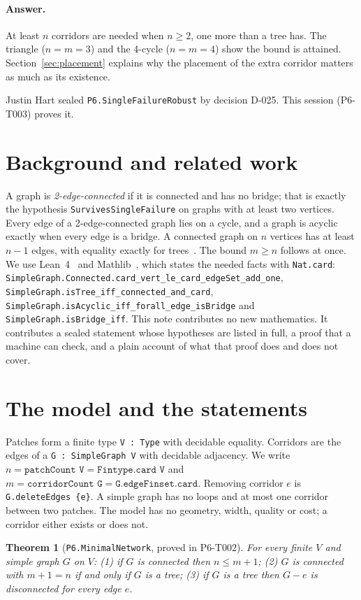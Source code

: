 \documentclass[11pt]{article}
\newtheorem{theorem}{Theorem}
\begin{document}
\paragraph{Answer.} At least $n$ corridors are needed when $n\ge 2$, one more than a tree has. The triangle
($n=m=3$) and the 4-cycle ($n=m=4$) show the bound is attained. Section~\ref{sec:placement} explains why the
placement of the extra corridor matters as much as its existence.

Justin Hart sealed \texttt{P6.SingleFailureRobust} by decision D-025. This session (P6-T003) proves it.

\section{Background and related work}
A graph is \emph{2-edge-connected} if it is connected and has no bridge; that is exactly the hypothesis
\texttt{SurvivesSingleFailure} on graphs with at least two vertices. Every edge of a 2-edge-connected graph
lies on a cycle, and a graph is acyclic exactly when every edge is a bridge. A connected graph on $n$
vertices has at least $n-1$ edges, with equality exactly for trees~\citep{diestel2017}. The bound $m\ge n$
follows at once. We use Lean~4~\citep{lean4} and Mathlib~\citep{mathlib2020}, which states the needed facts
with \texttt{Nat.card}: \texttt{SimpleGraph.Connected.card\_vert\_le\_card\_edgeSet\_add\_one},
\texttt{SimpleGraph.isTree\_iff\_connected\_and\_card},
\texttt{SimpleGraph.isAcyclic\_iff\_forall\_edge\_isBridge} and \texttt{SimpleGraph.isBridge\_iff}.
This note contributes no new mathematics. It contributes a sealed statement whose hypotheses are listed
in full, a proof that a machine can check, and a plain account of what that proof does and does not cover.

\section{The model and the statements}
Patches form a finite type \texttt{V : Type} with decidable equality. Corridors are the edges of a
\texttt{G : SimpleGraph V} with decidable adjacency. We write $n=\texttt{patchCount V}=\texttt{Fintype.card V}$ and
$m=\texttt{corridorCount G}=\texttt{G.edgeFinset.card}$. Removing corridor $e$ is \texttt{G.deleteEdges \{e\}}.
A simple graph has no loops and at most one corridor between two patches. The model has no geometry, width,
quality or cost; a corridor either exists or does not.

\begin{theorem}[\texttt{P6.MinimalNetwork}, proved in P6-T002]\label{thm:min}
For every finite $V$ and simple graph $G$ on $V$: (1) if $G$ is connected then $n\le m+1$; (2) $G$ is
connected with $m+1=n$ if and only if $G$ is a tree; (3) if $G$ is a tree then $G-e$ is disconnected for
every edge $e$.
\end{theorem}
\end{document}
